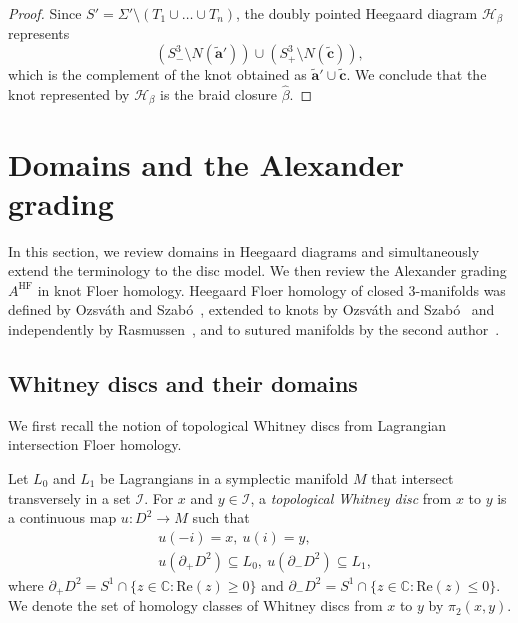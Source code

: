 \documentclass[11pt]{amsart}
\numberwithin{equation}{section}
\numberwithin{figure}{section}
\theoremstyle{definition}
\newcommand{\cH}{\mathcal{H}}
\newcommand{\cI}{\mathcal{I}}
\DeclareMathOperator{\HF}{HF}
\newcommand{\ba}{\boldsymbol{a}}
\begin{document}
\begin{proof}
\medskip{} Since $S' = \Sigma' \setminus (T_1 \cup \dots \cup T_n)$, the doubly pointed Heegaard diagram $\cH_{\beta}$ represents 
\[
\left(S^3_- \setminus N(\tilde{\ba}')\right) \cup \left(S^3_+ \setminus N(\tilde{\boldsymbol{c}})\right), 
\]
which is the complement of the knot obtained as $\tilde{\ba}' \cup \tilde{\boldsymbol{c}}$. We conclude that the knot represented by $\cH_\beta$ is the braid closure $\hat{\beta}$.
\end{proof}

\section{Domains and the Alexander grading}

In this section, we review domains in Heegaard diagrams and simultaneously extend the terminology to the disc model. We then review the Alexander grading $A^{\HF}$ in knot Floer homology. Heegaard Floer homology of closed 3-manifolds was defined by Ozsv\'ath and Szab\'o~\cite{OS, OS1}, extended to knots by Ozsv\'ath and Szab\'o~\cite{OS2} and independently by Rasmussen~\cite{Rass}, and to sutured manifolds by the second author~\cite{Juhasz1}.

\subsection{Whitney discs and their domains}

We first recall the notion of topological Whitney discs from Lagrangian intersection Floer homology.

\begin{defn} 
Let $L_0$ and $L_1$ be Lagrangians in a symplectic manifold $M$ that intersect transversely in a set $\cI$. For $x$ and $y \in \cI$, a \emph{topological Whitney disc} from $x$ to $y$ is a continuous map $u \colon D^2 \rightarrow M$
such that \begin{equation}
\begin{aligned}
&u(-i)=x, \ u(i)=y,\\
&u(\partial_+ D^2) \subseteq L_0, \ u(\partial_- D^2) \subseteq L_1,
\end{aligned}
\end{equation}
where $\partial_+ D^2 = S^1 \cap \{z \in \mathbb C : \text{Re}(z) \ge 0\}$ and $\partial_- D^2 = S^1 \cap \{z \in \mathbb C : \text{Re}(z) \le 0\}$. We denote the set of homology classes of Whitney discs from $x$ to $y$ by $\pi_2(x,y)$. 
\end{defn}
\end{document}
